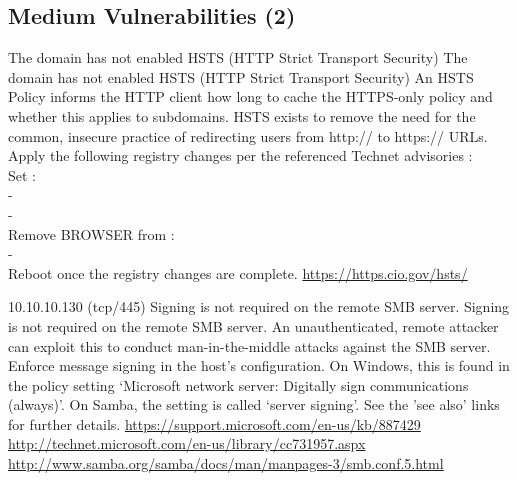 
\subsection{Medium Vulnerabilities (2)}
\begin{tcolorbox}[
	title=Communication is not secure,
	colback=yellow!5!white,
	colframe=yellow!75!black,
	subtitle style={boxrule=0.4pt, colback=yellow!50!white}	
	] 
	The domain has not enabled HSTS (HTTP Strict Transport Security)
The domain has not enabled HSTS (HTTP Strict Transport Security)
An HSTS Policy informs the HTTP client how long to cache the HTTPS-only policy and whether this applies to subdomains. HSTS exists to remove the need for the common, insecure practice of redirecting users from http:// to https:// URLs.
Apply the following registry changes per the referenced Technet advisories :\\
Set :\\
-\\
-\\
Remove BROWSER from :\\
-\\ 
Reboot once the registry changes are complete.
\url{https://https.cio.gov/hsts/}\\
\end{tcolorbox}

\begin{tcolorbox}[
	title=SMB Signing Disabled - Nessus Plugin ID 57608,
	colback=yellow!5!white,
	colframe=yellow!75!black,
	subtitle style={boxrule=0.4pt, colback=yellow!50!white}	
	] 
	10.10.10.130 (tcp/445)
Signing is not required on the remote SMB server.
Signing is not required on the remote SMB server. An unauthenticated, remote attacker can exploit this to conduct man-in-the-middle attacks against the SMB server.
Enforce message signing in the host's configuration. On Windows, this is found in the policy setting `Microsoft network server: Digitally sign communications (always)'. On Samba, the setting is called `server signing'. See the 'see also' links for further details.
\url{https://support.microsoft.com/en-us/kb/887429}\\
\url{http://technet.microsoft.com/en-us/library/cc731957.aspx}\\
\url{http://www.samba.org/samba/docs/man/manpages-3/smb.conf.5.html}
\end{tcolorbox}